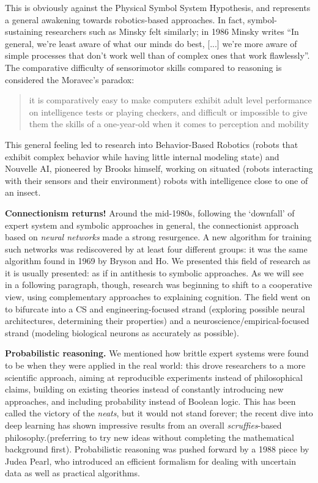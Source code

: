 \documentclass[../main.tex]{subfiles}
\begin{document}
This is obviously against the Physical Symbol System Hypothesis, and represents a general awakening towards robotics-based approaches. In fact, symbol-sustaining researchers such as Minsky felt similarly; in 1986 Minsky writes \enquote{In general, we're least aware of what our minds do best, [...] we're more aware of simple processes that don't work well than of complex ones that work flawlessly}\cite{minskySocietyMind1986}. The comparative difficulty of sensorimotor skills compared to reasoning is considered the Moravec's paradox:
\begin{quote}
    it is comparatively easy to make computers exhibit adult level performance on intelligence tests or playing checkers, and difficult or impossible to give them the skills of a one-year-old when it comes to perception and mobility
\end{quote}\cite{moravecMindChildrenFuture1988}
This general feeling led to research into Behavior-Based Robotics (robots that exhibit complex behavior while having little internal modeling state) and Nouvelle AI, pioneered by Brooks himself, working on situated (robots interacting with their sensors and their environment) robots with intelligence close to one of an insect.

\vspace{4pt}
\textbf{Connectionism returns!} Around the mid-1980s, following the `downfall' of expert system and symbolic approaches in general, the connectionist approach based on \textit{neural networks} made a strong resurgence. A new algorithm for training such networks was rediscovered by at least four different groups\cite{russellArtificialIntelligenceModern2002}: it was the same algorithm found in 1969 by Bryson and Ho. We presented this field of research as it is usually presented: as if in antithesis to symbolic approaches. As we will see in a following paragraph, though, research was beginning to shift to a cooperative view, using complementary approaches to explaining cognition. The field went on to bifurcate into a CS and engineering-focused strand (exploring possible neural architectures, determining their properties) and a neuroscience/empirical-focused strand (modeling biological neurons as accurately as possible).

\vspace{4pt}
\textbf{Probabilistic reasoning.} We mentioned how brittle expert systems were found to be when they were applied in the real world: this drove researchers to a more scientific approach, aiming at reproducible experiments instead of philosophical claims, building on existing theories instead of constantly introducing new approaches, and including probability instead of Boolean logic. This has been called the victory of the \textit{neats}, but it would not stand forever; the recent dive into deep learning has shown impressive results from an overall \textit{scruffies}-based philosophy.(preferring to try new ideas without completing the mathematical background first). Probabilistic reasoning was pushed forward by a 1988 piece by Judea Pearl\cite{pearlProbabilisticReasoningIntelligent1988}, who introduced an efficient formalism for dealing with uncertain data as well as practical algorithms.
\end{document}
